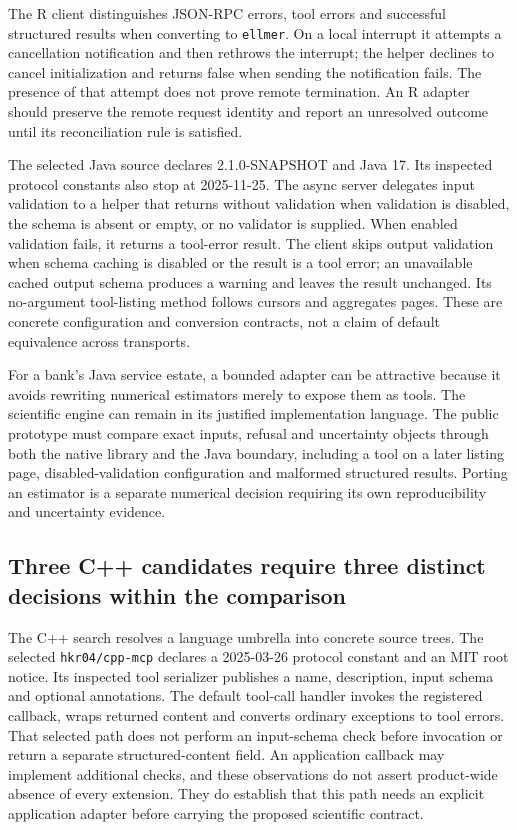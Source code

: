 The R client distinguishes JSON-RPC errors, tool errors and successful
structured results when converting to \texttt{ellmer}. On a local interrupt
it attempts a cancellation notification and then rethrows the interrupt;
the helper declines to cancel initialization and returns false when sending
the notification fails. The presence of that attempt does not prove remote
termination. An R adapter should preserve the remote request identity and
report an unresolved outcome until its reconciliation rule is satisfied.
\citep{exec24_mcp_r,exec24_mcp_contracts}

The selected Java source declares 2.1.0-SNAPSHOT and Java 17. Its inspected
protocol constants also stop at 2025-11-25. The async server delegates input
validation to a helper that returns without validation when validation is
disabled, the schema is absent or empty, or no validator is supplied. When
enabled validation fails, it returns a tool-error result. The client skips
output validation when schema caching is disabled or the result is a tool
error; an unavailable cached output schema produces a warning and leaves
the result unchanged. Its no-argument tool-listing method follows cursors
and aggregates pages. These are concrete configuration and conversion
contracts, not a claim of default equivalence across transports.
\citep{exec24_mcp_java}

For a bank's Java service estate, a bounded adapter can be attractive because
it avoids rewriting numerical estimators merely to expose them as tools.
The scientific engine can remain in its justified implementation language.
The public prototype must compare exact inputs, refusal and uncertainty
objects through both the native library and the Java boundary, including a
tool on a later listing page, disabled-validation configuration and malformed
structured results. Porting an estimator is a separate numerical decision
requiring its own reproducibility and uncertainty evidence.
\citep{exec24_mcp_java,exec24_mcp_contracts}

\subsection{Three C++ candidates require three distinct decisions within the comparison}

The C++ search resolves a language umbrella into concrete source trees.
The selected \texttt{hkr04/cpp-mcp} declares a 2025-03-26 protocol constant
and an MIT root notice. Its inspected tool serializer publishes a name,
description, input schema and optional annotations. The default tool-call
handler invokes the registered callback, wraps returned content and
converts ordinary exceptions to tool errors. That selected path does not
perform an input-schema check before invocation or return a separate
structured-content field. An application callback may implement additional
checks, and these observations do not assert product-wide absence of every
extension. They do establish that this path needs an explicit application
adapter before carrying the proposed scientific contract.
\citep{exec24_mcp_cpp_hkr}

